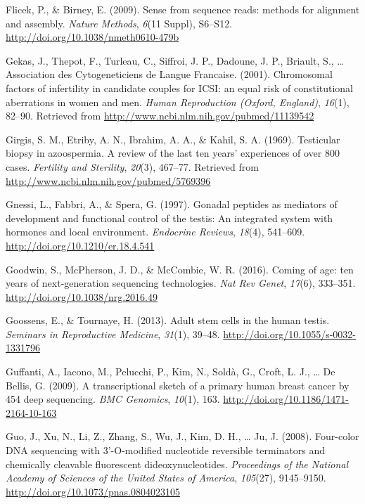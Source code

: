 \documentclass[12pt,twoside]{reedthesis}
\theoremstyle{definition}
\theoremstyle{definition}
\theoremstyle{remark}
\begin{document}
  \hypertarget{ref-Flicek2009}{}
  Flicek, P., \& Birney, E. (2009). Sense from sequence reads: methods for
  alignment and assembly. \emph{Nature Methods}, \emph{6}(11 Suppl),
  S6--S12. \url{http://doi.org/10.1038/nmeth0610-479b}
  
  \hypertarget{ref-Gekas2001}{}
  Gekas, J., Thepot, F., Turleau, C., Siffroi, J. P., Dadoune, J. P.,
  Briault, S., \ldots{} Association des Cytogeneticiens de Langue
  Francaise. (2001). Chromosomal factors of infertility in candidate
  couples for ICSI: an equal risk of constitutional aberrations in women
  and men. \emph{Human Reproduction (Oxford, England)}, \emph{16}(1),
  82--90. Retrieved from \url{http://www.ncbi.nlm.nih.gov/pubmed/11139542}
  
  \hypertarget{ref-Girgis}{}
  Girgis, S. M., Etriby, A. N., Ibrahim, A. A., \& Kahil, S. A. (1969).
  Testicular biopsy in azoospermia. A review of the last ten years'
  experiences of over 800 cases. \emph{Fertility and Sterility},
  \emph{20}(3), 467--77. Retrieved from
  \url{http://www.ncbi.nlm.nih.gov/pubmed/5769396}
  
  \hypertarget{ref-Gnessi1997}{}
  Gnessi, L., Fabbri, A., \& Spera, G. (1997). Gonadal peptides as
  mediators of development and functional control of the testis: An
  integrated system with hormones and local environment. \emph{Endocrine
  Reviews}, \emph{18}(4), 541--609.
  \url{http://doi.org/10.1210/er.18.4.541}
  
  \hypertarget{ref-Goodwin2016}{}
  Goodwin, S., McPherson, J. D., \& McCombie, W. R. (2016). Coming of age:
  ten years of next-generation sequencing technologies. \emph{Nat Rev
  Genet}, \emph{17}(6), 333--351. \url{http://doi.org/10.1038/nrg.2016.49}
  
  \hypertarget{ref-Goossens2013}{}
  Goossens, E., \& Tournaye, H. (2013). Adult stem cells in the human
  testis. \emph{Seminars in Reproductive Medicine}, \emph{31}(1), 39--48.
  \url{http://doi.org/10.1055/s-0032-1331796}
  
  \hypertarget{ref-Guffanti2009}{}
  Guffanti, A., Iacono, M., Pelucchi, P., Kim, N., Soldà, G., Croft, L.
  J., \ldots{} De Bellis, G. (2009). A transcriptional sketch of a primary
  human breast cancer by 454 deep sequencing. \emph{BMC Genomics},
  \emph{10}(1), 163. \url{http://doi.org/10.1186/1471-2164-10-163}
  
  \hypertarget{ref-Guo2008}{}
  Guo, J., Xu, N., Li, Z., Zhang, S., Wu, J., Kim, D. H., \ldots{} Ju, J.
  (2008). Four-color DNA sequencing with 3'-O-modified nucleotide
  reversible terminators and chemically cleavable fluorescent
  dideoxynucleotides. \emph{Proceedings of the National Academy of
  Sciences of the United States of America}, \emph{105}(27), 9145--9150.
  \url{http://doi.org/10.1073/pnas.0804023105}
  
\end{document}
